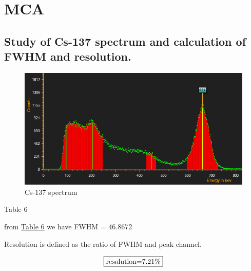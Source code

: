 \section{MCA}
	\subsection{Study of Cs-137 spectrum and calculation of FWHM and resolution.}
		\begin{figure}[H]
			\centering
			\includegraphics[width=0.9\columnwidth]{images/Cs.PNG}
			\caption{Cs-137 spectrum}
			\label{fig:cs}
		\end{figure}
		Table 6
		
		from \hyperref[tab:cs]{Table 6} we have FWHM = $46.8672$

		Resolution is defined as the ratio of FWHM and peak channel.

		$$\fbox{resolution=7.21\%}$$
